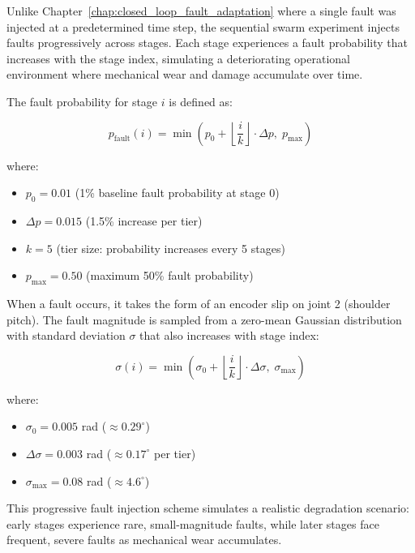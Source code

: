 \documentclass[12pt,a4paper,oneside]{report}
\begin{document}
Unlike Chapter~\ref{chap:closed_loop_fault_adaptation} where a single fault was injected at a predetermined time step, the sequential swarm experiment injects faults progressively across stages. Each stage experiences a fault probability that increases with the stage index, simulating a deteriorating operational environment where mechanical wear and damage accumulate over time.

The fault probability for stage $i$ is defined as:

\begin{equation}
p_{\text{fault}}(i) = \min\left(p_0 + \left\lfloor \frac{i}{k} \right\rfloor \cdot \Delta p,\; p_{\text{max}}\right)
\end{equation}

where:
\begin{itemize}
    \item $p_0 = 0.01$ (1\% baseline fault probability at stage 0)
    \item $\Delta p = 0.015$ (1.5\% increase per tier)
    \item $k = 5$ (tier size: probability increases every 5 stages)
    \item $p_{\text{max}} = 0.50$ (maximum 50\% fault probability)
\end{itemize}

When a fault occurs, it takes the form of an encoder slip on joint 2 (shoulder pitch). The fault magnitude is sampled from a zero-mean Gaussian distribution with standard deviation $\sigma$ that also increases with stage index:

\begin{equation}
\sigma(i) = \min\left(\sigma_0 + \left\lfloor \frac{i}{k} \right\rfloor \cdot \Delta \sigma,\; \sigma_{\text{max}}\right)
\end{equation}

where:
\begin{itemize}
    \item $\sigma_0 = 0.005$ rad ($\approx 0.29^\circ$)
    \item $\Delta \sigma = 0.003$ rad ($\approx 0.17^\circ$ per tier)
    \item $\sigma_{\text{max}} = 0.08$ rad ($\approx 4.6^\circ$)
\end{itemize}

This progressive fault injection scheme simulates a realistic degradation scenario: early stages experience rare, small-magnitude faults, while later stages face frequent, severe faults as mechanical wear accumulates.
\end{document}
